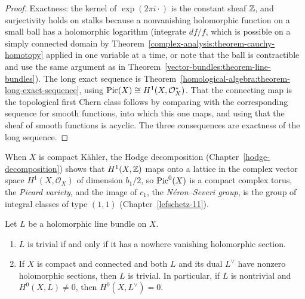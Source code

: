 \begin{proof}
Exactness: the kernel of $\exp(2\pi i \cdot)$ is the constant sheaf $\mathbb{Z}$, and surjectivity holds on stalks because a nonvanishing holomorphic function on a small ball has a holomorphic logarithm (integrate
$df/f$, which is possible on a simply connected domain by Theorem~\ref{complex-analysis:theorem-cauchy-homotopy} applied in one variable at a time, or note that the ball is contractible and use the same
argument as in Theorem~\ref{vector-bundles:theorem-line-bundles}). The long exact sequence is Theorem~\ref{homological-algebra:theorem-long-exact-sequence}, using
$\operatorname{Pic}(X) \cong H^1(X, \mathcal{O}_X^*)$. That the connecting map is the topological first Chern class follows by comparing with the corresponding sequence for smooth functions, into which this one maps, and
using that the sheaf of smooth functions is acyclic. The three consequences are exactness of the long sequence.
\end{proof}

\begin{remark}\label{holomorphic-bundles:remark-picard-variety}
When $X$ is compact K\"ahler, the Hodge decomposition (Chapter~\ref{hodge-decomposition}) shows that $H^1(X, \mathbb{Z})$ maps onto a lattice in the complex vector space $H^1(X, \mathcal{O}_X)$ of dimension
$b_1/2$, so $\operatorname{Pic}^0(X)$ is a compact complex torus, the \emph{Picard variety}, and the image of $c_1$, the \emph{N\'eron--Severi group}, is the group of integral classes of type $(1,1)$
(Chapter~\ref{lefschetz-11}).
\end{remark}

\begin{lemma}\label{holomorphic-bundles:lemma-trivial-sections}
Let $L$ be a holomorphic line bundle on $X$.
\begin{enumerate}
\item $L$ is trivial if and only if it has a nowhere vanishing holomorphic section.
\item If $X$ is compact and connected and both $L$ and its dual $L^\vee$ have nonzero holomorphic sections, then $L$ is trivial. In particular, if $L$ is nontrivial and $H^0(X, L) \neq 0$, then
$H^0(X, L^\vee) = 0$.
\end{enumerate}
\end{lemma}

